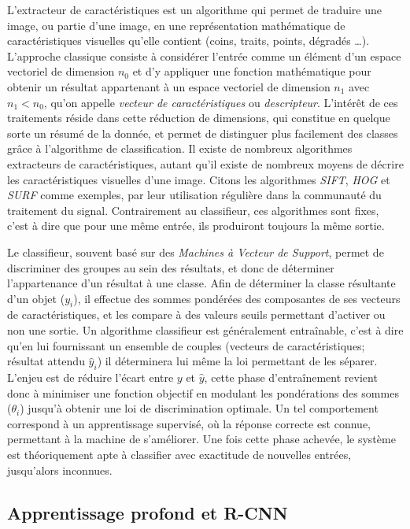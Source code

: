 			L'extracteur de caractéristiques est un algorithme qui permet de traduire une image, ou partie d'une image, en une représentation mathématique de caractéristiques visuelles qu'elle contient (coins, traits, points, dégradés \dots). L'approche classique consiste à considérer l'entrée comme un élément d'un espace vectoriel de dimension $n_{0}$ et d'y appliquer une fonction mathématique pour obtenir un résultat appartenant à un espace vectoriel de dimension $n_{1}$ avec $n_{1} < n_{0}$, qu'on appelle \emph{vecteur de caractéristiques} ou \emph{descripteur}. L'intérêt de ces traitements réside dans cette réduction de dimensions, qui constitue en quelque sorte un résumé de la donnée, et permet de distinguer plus facilement des classes grâce à l'algorithme de classification. Il existe de nombreux algorithmes extracteurs de caractéristiques, autant qu'il existe de nombreux moyens de décrire les caractéristiques visuelles d'une image. Citons les algorithmes \emph{SIFT}\cite{sift}, \emph{HOG}\cite{hog} et \emph{SURF}\cite{surf} comme exemples, par leur utilisation régulière dans la communauté du traitement du signal. Contrairement au classifieur, ces algorithmes sont fixes, c'est à dire que pour une même entrée, ils produiront toujours la même sortie.
			\par
			Le classifieur, souvent basé sur des \emph{Machines à Vecteur de Support}\cite{svm}, permet de discriminer des groupes au sein des résultats, et donc de déterminer l'appartenance d'un résultat à une classe. Afin de déterminer la classe résultante d'un objet ($y_{i}$), il effectue des sommes pondérées des composantes de ses vecteurs de caractéristiques, et les compare à des valeurs seuils permettant d'activer ou non une sortie. Un algorithme classifieur est généralement entraînable, c'est à dire qu'en lui fournissant un ensemble de couples (vecteurs de caractéristiques; résultat attendu $\hat{y}_{i}$) il déterminera lui même la loi permettant de les séparer. L'enjeu est de réduire l'écart entre $y$ et $\hat{y}$, cette phase d'entraînement revient donc à minimiser une fonction objectif en modulant les pondérations des sommes ($\theta_{i}$) jusqu'à obtenir une loi de discrimination optimale. Un tel comportement correspond à un apprentissage supervisé, où la réponse correcte est connue, permettant à la machine de s'améliorer. Une fois cette phase achevée, le système est théoriquement apte à classifier avec exactitude de nouvelles entrées, jusqu'alors inconnues.

		\subsection{Apprentissage profond et R-CNN}

